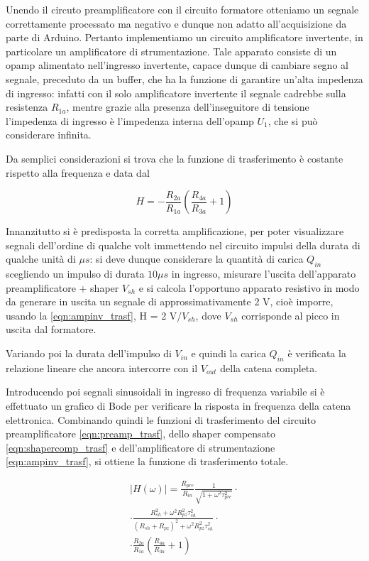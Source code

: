 \documentclass{article}
\begin{document}
Unendo il circuto preamplificatore con il circuito formatore otteniamo un segnale correttamente processato ma negativo e dunque non
adatto all'acquisizione da parte di Arduino. Pertanto implementiamo un circuito amplificatore invertente, in particolare un
amplificatore di strumentazione. Tale apparato consiste di un opamp alimentato nell'ingresso invertente, capace dunque di cambiare
segno al segnale, preceduto da un buffer, che ha la funzione di garantire un'alta impedenza di ingresso: infatti con il solo 
amplificatore invertente il segnale cadrebbe sulla resistenza $R_{1a}$, mentre grazie alla presenza dell'inseguitore di tensione 
l'impedenza di ingresso è l'impedenza interna dell'opamp $U_1$, che si può considerare infinita.

Da semplici considerazioni si trova che la funzione di trasferimento è costante rispetto alla frequenza e data dal

\begin{equation}
    \label{eqn:ampinv_trasf}
    H = - \frac{R_{2a}}{R_{1a}} \left( \frac{R_{4a}}{R_{3a}} + 1 \right)
\end{equation}

Innanzitutto si è predisposta la corretta amplificazione, per poter visualizzare segnali dell'ordine di qualche volt immettendo
nel circuito impulsi della durata di qualche unità di $\mu s$: si deve dunque considerare la quantità di carica $Q_{in}$ 
scegliendo un impulso di durata $10 \mu s$ in ingresso, misurare l'uscita dell'apparato preamplificatore + shaper $V_{sh}$ 
e si calcola l'opportuno apparato resistivo in modo da generare in uscita un segnale di approssimativamente 2 V, cioè imporre, usando
la \ref{eqn:ampinv_trasf}, H = 2 V/$V_{sh}$, dove $V_{sh}$ corrisponde al picco in uscita dal formatore.

Variando poi la durata dell'impulso di $V_{in}$ e quindi la carica $Q_{in}$ è verificata la relazione lineare che ancora
intercorre con il $V_{out}$ della catena completa.

Introducendo poi segnali sinusoidali in ingresso di frequenza variabile si è effettuato un grafico di Bode per verificare la risposta
in frequenza della catena elettronica. Combinando quindi le funzioni di trasferimento del circuito preamplificatore 
\ref{eqn:preamp_trasf}, dello shaper compensato \ref{eqn:shapercomp_trasf} e dell'amplificatore di strumentazione 
\ref{eqn:ampinv_trasf}, si ottiene la funzione di trasferimento totale.

\begin{multline}
    \label{eqn:catena_trasf}
    |H(\omega)| = \frac{R_{pre}}{R_{in}} \frac{1}{\sqrt{1+\omega^2\tau_{pre}^2}} \cdot \\
    \cdot \frac{R_{sh}^2 + \omega^2 R_{pz}^2 \tau_{sh}^2}{(R_{sh}+R_{pz})^2 + \omega^2 R_{pz}^2 \tau_{sh}^2} \cdot \\
    \cdot \frac{R_{2a}}{R_{1a}} \left( \frac{R_{4a}}{R_{3a}} + 1 \right)
\end{multline}
\end{document}

